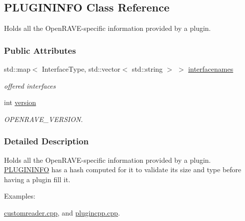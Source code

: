 \hypertarget{classOpenRAVE_1_1PLUGININFO}{
\subsection{PLUGININFO Class Reference}
\label{classOpenRAVE_1_1PLUGININFO}
}


Holds all the OpenRAVE-\/specific information provided by a plugin.  


\subsubsection*{Public Attributes}
\begin{DoxyCompactItemize}
\item 
\hypertarget{classOpenRAVE_1_1PLUGININFO_a2d74b2b8311c0e6ed7e4afb33a98efa0}{
std::map$<$ InterfaceType, std::vector$<$ std::string $>$ $>$ \hyperlink{classOpenRAVE_1_1PLUGININFO_a2d74b2b8311c0e6ed7e4afb33a98efa0}{interfacenames}}
\label{classOpenRAVE_1_1PLUGININFO_a2d74b2b8311c0e6ed7e4afb33a98efa0}

\begin{DoxyCompactList}\small\item\em offered interfaces \item\end{DoxyCompactList}\item 
\hypertarget{classOpenRAVE_1_1PLUGININFO_aad880fc4455c253781e8968f2239d56f}{
int \hyperlink{classOpenRAVE_1_1PLUGININFO_aad880fc4455c253781e8968f2239d56f}{version}}
\label{classOpenRAVE_1_1PLUGININFO_aad880fc4455c253781e8968f2239d56f}

\begin{DoxyCompactList}\small\item\em OPENRAVE\_\-VERSION. \item\end{DoxyCompactList}\end{DoxyCompactItemize}


\subsubsection{Detailed Description}
Holds all the OpenRAVE-\/specific information provided by a plugin. \hyperlink{classOpenRAVE_1_1PLUGININFO}{PLUGININFO} has a hash computed for it to validate its size and type before having a plugin fill it. \begin{Desc}
\item[Examples: ]\par


\hyperlink{customreader_8cpp-example}{customreader.cpp}, and \hyperlink{plugincpp_8cpp-example}{plugincpp.cpp}.

\end{Desc}
